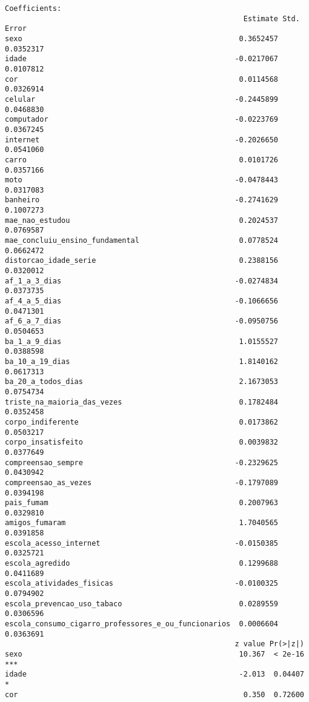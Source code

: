 \documentclass[
]{article}
\begin{document}
\begin{verbatim}
Coefficients:
                                                       Estimate Std. Error
sexo                                                  0.3652457  0.0352317
idade                                                -0.0217067  0.0107812
cor                                                   0.0114568  0.0326914
celular                                              -0.2445899  0.0468830
computador                                           -0.0223769  0.0367245
internet                                             -0.2026650  0.0541060
carro                                                 0.0101726  0.0357166
moto                                                 -0.0478443  0.0317083
banheiro                                             -0.2741629  0.1007273
mae_nao_estudou                                       0.2024537  0.0769587
mae_concluiu_ensino_fundamental                       0.0778524  0.0662472
distorcao_idade_serie                                 0.2388156  0.0320012
af_1_a_3_dias                                        -0.0274834  0.0373735
af_4_a_5_dias                                        -0.1066656  0.0471301
af_6_a_7_dias                                        -0.0950756  0.0504653
ba_1_a_9_dias                                         1.0155527  0.0388598
ba_10_a_19_dias                                       1.8140162  0.0617313
ba_20_a_todos_dias                                    2.1673053  0.0754734
triste_na_maioria_das_vezes                           0.1782484  0.0352458
corpo_indiferente                                     0.0173862  0.0503217
corpo_insatisfeito                                    0.0039832  0.0377649
compreensao_sempre                                   -0.2329625  0.0430942
compreensao_as_vezes                                 -0.1797089  0.0394198
pais_fumam                                            0.2007963  0.0329810
amigos_fumaram                                        1.7040565  0.0391858
escola_acesso_internet                               -0.0150385  0.0325721
escola_agredido                                       0.1299688  0.0411689
escola_atividades_fisicas                            -0.0100325  0.0794902
escola_prevencao_uso_tabaco                           0.0289559  0.0306596
escola_consumo_cigarro_professores_e_ou_funcionarios  0.0006604  0.0363691
                                                     z value Pr(>|z|)    
sexo                                                  10.367  < 2e-16 ***
idade                                                 -2.013  0.04407 *  
cor                                                    0.350  0.72600    

\end{verbatim}
\end{document}

